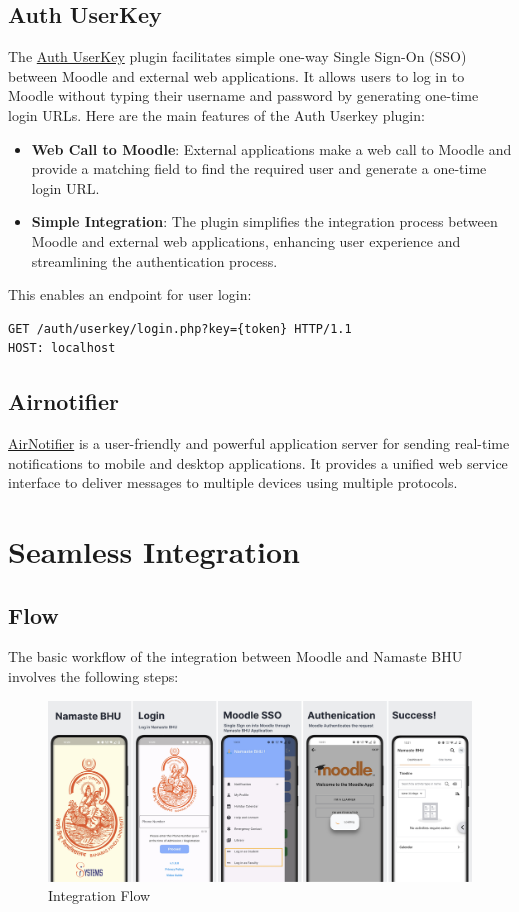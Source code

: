 \subsection{Auth UserKey}
The \href{https://moodle.org/plugins/auth_userkey}{Auth UserKey} plugin facilitates simple one-way Single Sign-On (SSO) between Moodle and external web applications. It allows users to log in to Moodle without typing their username and password by generating one-time login URLs. Here are the main features of the Auth Userkey plugin:

\begin{itemize}
    \item \textbf{Web Call to Moodle}: External applications make a web call to Moodle and provide a matching field to find the required user and generate a one-time login URL.
    \item \textbf{Simple Integration}: The plugin simplifies the integration process between Moodle and external web applications, enhancing user experience and streamlining the authentication process.
\end{itemize}

This enables an endpoint for user login:
\begin{verbatim}
GET /auth/userkey/login.php?key={token} HTTP/1.1
HOST: localhost
\end{verbatim}

\subsection{Airnotifier}
\href{https://github.com/dcai/airnotifier}{AirNotifier} is a user-friendly and powerful application server for sending real-time notifications to mobile and desktop applications. It provides a unified web service interface to deliver messages to multiple devices using multiple protocols.

\section{Seamless Integration}
\subsection{Flow}

The basic workflow of the integration between Moodle and Namaste BHU involves the following steps:

\begin{figure}
    \centering
    \includegraphics[width=\linewidth]{assets/img/flow-opt.jpg}
    \caption{Integration Flow}
    \label{fig:flow}
\end{figure}

